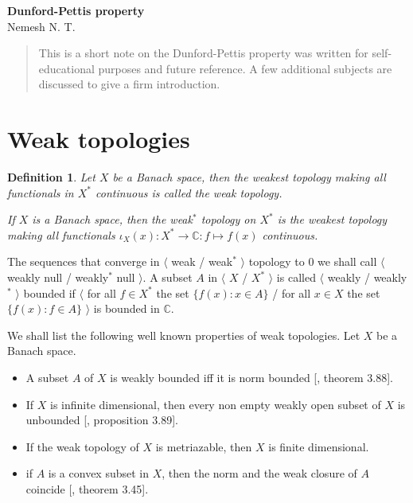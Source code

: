 \documentclass[12pt]{article}
\newtheorem{definition}[theorem]{Definition}
\begin{document}
\begin{center}

\Large \textbf{Dunford-Pettis property}\\[0.5cm]
\small {Nemesh N. T.}\\[0.5cm]

\end{center}

\begin{abstract}
This is a short note on the Dunford-Pettis property was written for self-educational purposes and future reference. A few additional subjects are discussed to give a firm introduction.
\end{abstract}

\section{Weak topologies}

\begin{definition} Let $X$ be a Banach space, then the weakest topology making all functionals in $X^*$ continuous is called the weak topology.

If $X$ is a Banach space, then the weak${}^*$ topology on $X^*$ is the weakest topology making all functionals $\iota_X(x):X^*\to\mathbb{C}:f\mapsto f(x)$ continuous.
\end{definition}

The sequences that converge in $\langle$ weak / weak${}^*$ $\rangle$ topology to $0$ we shall call $\langle$ weakly null / weakly${}^*$ null $\rangle$. A subset $A$ in $\langle$ $X$ / $X^*$ $\rangle$ is called $\langle$ weakly / weakly${}^*$ $\rangle$ bounded if $\langle$ for all $f\in X^*$ the set $\{f(x):x\in A\}$ / for all $x\in X$ the set $\{f(x):f\in A\}$ $\rangle$ is bounded in $\mathbb{C}$.

We shall list the following well known properties of weak topologies. Let $X$ be a Banach space.

\begin{itemize}

\item A subset $A$ of $X$ is weakly bounded iff it is norm bounded [\cite{FabHabBanSpTh}, theorem 3.88].

\item If $X$ is infinite dimensional, then every non empty weakly open subset of $X$ is unbounded [\cite{FabHabBanSpTh}, proposition 3.89].

\item If the weak topology of $X$ is metriazable, then $X$ is finite dimensional.

\item if $A$ is a convex subset in $X$, then the norm and the weak closure of $A$ coincide [\cite{FabHabBanSpTh}, theorem 3.45].

\end{itemize}
\end{document}
